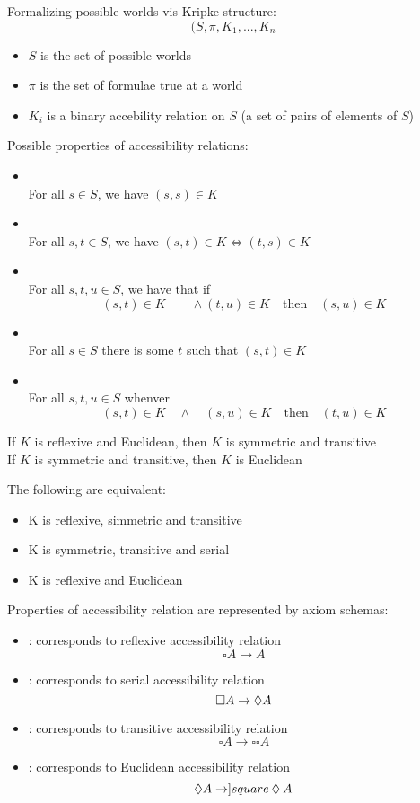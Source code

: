 Formalizing possible worlds vis Kripke structure:
\[(S, \pi, K_1, ... , K_n\]
\begin{itemize}
\item $S$ is the set of possible worlds
\item $\pi$ is the set of formulae true at a world
\item $K_i$ is a binary accebility relation on $S$ (a set of pairs of elements of $S$)
\end{itemize}
Possible properties of accessibility relations:
\begin{itemize}
\item {}\\
For all $s\in S$, we have $(s,s)\in K$
\item {}\\
For all $s,t \in S$, we have $(s,t)\in K \iff (t,s)\in K$
\item {}\\
For all $s,t,u \in S$, we have that if 
\[(s,t)\in K \qquad \land (t,u)\in K \quad\text{then}\quad (s,u)\in K\]
\item {}\\
For all $s\in S$ there is some $t$ such that $(s,t)\in K$
\item {}\\
For all $s,t,u\in S$ whenver
\[(s,t)\in K \quad\land\quad (s,u)\in K\quad\text{then}\quad (t,u)\in K\]
\end{itemize}
If $K$ is reflexive and Euclidean, then $K$ is symmetric and transitive\\
If $K$ is symmetric and transitive, then $K$ is Euclidean

The following are equivalent:
\begin{itemize}
\item K is reflexive, simmetric and transitive
\item K is symmetric, transitive and serial 
\item K is reflexive and Euclidean
\end{itemize}

Properties of accessibility relation are represented by axiom schemas:
\begin{itemize}
\item {}: corresponds to reflexive accessibility relation
\[\square A \rightarrow A\]
\item {}: corresponds to serial accessibility relation
\[\square A \rightarrow \mathbin{\Diamond} A\]
\item {}: corresponds to transitive accessibility relation
\[\square A \rightarrow \square\square A\]
\item {}: corresponds to Euclidean accessibility relation
\[\mathbin{\Diamond} A\rightarrow ]square \mathbin{\Diamond} A\]
\end{itemize}

